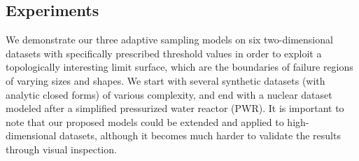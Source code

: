 %

\subsection{Experiments}
\label{sec:experiments}
We demonstrate our three adaptive sampling models on six two-dimensional datasets with specifically prescribed threshold values in order to exploit a topologically interesting limit surface, which are the boundaries of failure regions of varying sizes and shapes.
%
We start with several synthetic datasets (with analytic closed forms) of various complexity, and end with a nuclear dataset modeled after a simplified pressurized water reactor (PWR).
%
It is important to note that our proposed models could be extended and applied to high-dimensional datasets, although it becomes much harder to validate the results through visual inspection.

